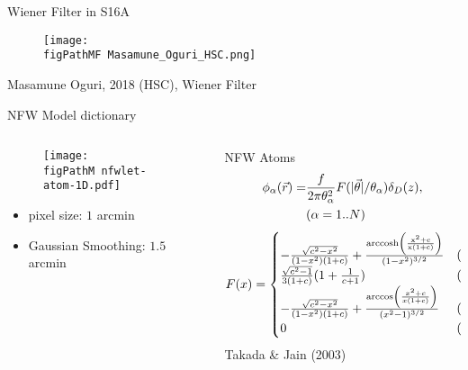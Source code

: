 \begin{frame}{Wiener Filter in S16A}
\begin{figure}
\texttt{[image: \\figPathMF Masamune\_Oguri\_HSC.png]}
\end{figure}
Masamune Oguri, 2018 (HSC), Wiener Filter
\end{frame}

\begin{frame}{NFW Model dictionary}
\begin{columns}
\begin{column}{0.4\textwidth}
\begin{figure}
\texttt{[image: \\figPathM nfwlet-atom-1D.pdf]}
\end{figure}
\begin{itemize}
    \item pixel size:  $1$ arcmin
    \item Gaussian Smoothing: $1.5$ arcmin
\end{itemize}
\end{column}
\begin{column}{0.6\textwidth}
\begin{alertblock}{NFW Atoms}
\begin{eqnarray}\notag
\phi_\alpha(\vec{r}) =&\frac{f }{2 \pi \theta_\alpha^2 }
F(|\vec{\theta}|/\theta_\alpha) \delta_D(z),\\
&  (\alpha=1..N)\notag
\end{eqnarray}
\begin{equation}\notag
F(x)=
\begin{cases}
-\frac{\sqrt{c^2-x^2}}{(1-x^2)(1+c)} + \frac{\rm{arccosh}
\left(\frac{x^2+c}{x(1+c)}\right)}{(1-x^2)^{3/2}}  & (x<1),\\
\frac{\sqrt{c^2-1}}{3(1+c)} (1+\frac{1}{c+1}) & (x=1),\\
-\frac{\sqrt{c^2-x^2}}{(1-x^2)(1+c)} +
\frac{\arccos\left(\frac{x^2+c}{x(1+c)}\right)}{(x^2-1)^{3/2}} & (1<x\leq c),\\
0& (x>c).
\end{cases}
\end{equation}
Takada \& Jain (2003)
\end{alertblock}
\end{column}
\end{columns}
\end{frame}


